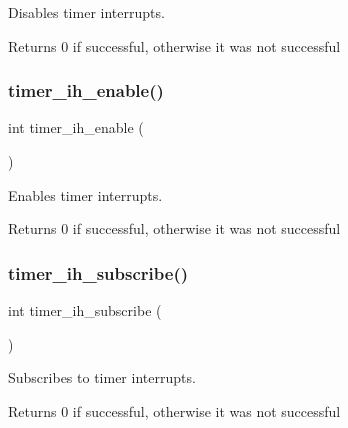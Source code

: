 Disables timer interrupts. 

\begin{DoxyReturn}{Returns}
0 if successful, otherwise it was not successful 
\end{DoxyReturn}
\mbox{\label{group__timer_ga4baf1b5c30d394576f8044178524e2c4}} 
\subsubsection{\texorpdfstring{timer\+\_\+ih\+\_\+enable()}{timer\_ih\_enable()}}
{\footnotesize\ttfamily int timer\+\_\+ih\+\_\+enable (\begin{DoxyParamCaption}{ }\end{DoxyParamCaption})}



Enables timer interrupts. 

\begin{DoxyReturn}{Returns}
0 if successful, otherwise it was not successful 
\end{DoxyReturn}
\mbox{\label{group__timer_gae44be0cfa0b6e717152afc708577cf5d}} 
\subsubsection{\texorpdfstring{timer\+\_\+ih\+\_\+subscribe()}{timer\_ih\_subscribe()}}
{\footnotesize\ttfamily int timer\+\_\+ih\+\_\+subscribe (\begin{DoxyParamCaption}{ }\end{DoxyParamCaption})}



Subscribes to timer interrupts. 

\begin{DoxyReturn}{Returns}
0 if successful, otherwise it was not successful 
\end{DoxyReturn}
\mbox{\label{group__timer_ga5e9cfb5b4e41a1e647e0ee7d0ed6709a}} 
